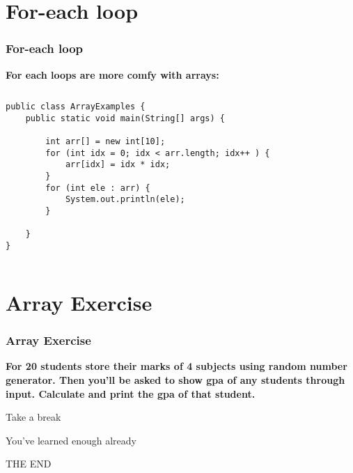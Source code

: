 \documentclass{beamer}
\begin{document}

\section{For-each loop}

\begin{frame}[fragile]
\frametitle{For-each loop}
\textbf{For each loops are more comfy with arrays:}\\
\begin{columns}[T]
\begin{column}{\textwidth}
\begin{lstlisting}
public class ArrayExamples {
    public static void main(String[] args) {

        int arr[] = new int[10];
        for (int idx = 0; idx < arr.length; idx++ ) {
            arr[idx] = idx * idx;
        }
        for (int ele : arr) {
            System.out.println(ele);
        }

    }
}
\end{lstlisting}
\end{column}
\end{columns}
\end{frame}



\section{Array Exercise}

\begin{frame}
\frametitle{Array Exercise}
\textbf{For 20 students store their marks of 4 subjects using random number generator. Then you'll be asked to show gpa of any students through input. Calculate and print the gpa of that student.}\\
\end{frame}




\begin{frame}
\Huge{\centerline{Take a break }}
\Huge{\centerline{You've learned enough already }}
\vspace{0.2in}
\Huge{\centerline{THE END }}
\end{frame}

\end{document}
